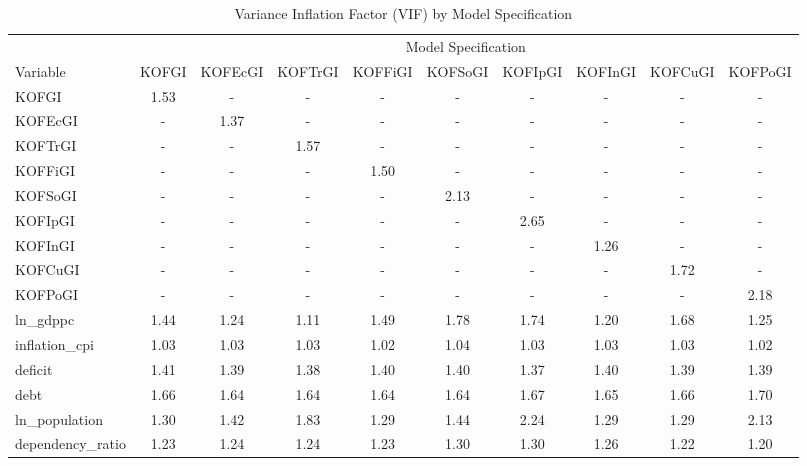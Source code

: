 \begin{table}
\caption{Variance Inflation Factor (VIF) by Model Specification}
\label{tab:vif}
\begin{tabular}{lccccccccc}
\toprule
& \multicolumn{9}{c}{Model Specification} \\
\cmidrule(lr){2-10}
Variable & KOFGI & KOFEcGI & KOFTrGI & KOFFiGI & KOFSoGI & KOFIpGI & KOFInGI & KOFCuGI & KOFPoGI \\
\midrule
KOFGI & 1.53 & - & - & - & - & - & - & - & - \\
KOFEcGI & - & 1.37 & - & - & - & - & - & - & - \\
KOFTrGI & - & - & 1.57 & - & - & - & - & - & - \\
KOFFiGI & - & - & - & 1.50 & - & - & - & - & - \\
KOFSoGI & - & - & - & - & 2.13 & - & - & - & - \\
KOFIpGI & - & - & - & - & - & 2.65 & - & - & - \\
KOFInGI & - & - & - & - & - & - & 1.26 & - & - \\
KOFCuGI & - & - & - & - & - & - & - & 1.72 & - \\
KOFPoGI & - & - & - & - & - & - & - & - & 2.18 \\
ln_gdppc & 1.44 & 1.24 & 1.11 & 1.49 & 1.78 & 1.74 & 1.20 & 1.68 & 1.25 \\
inflation_cpi & 1.03 & 1.03 & 1.03 & 1.02 & 1.04 & 1.03 & 1.03 & 1.03 & 1.02 \\
deficit & 1.41 & 1.39 & 1.38 & 1.40 & 1.40 & 1.37 & 1.40 & 1.39 & 1.39 \\
debt & 1.66 & 1.64 & 1.64 & 1.64 & 1.64 & 1.67 & 1.65 & 1.66 & 1.70 \\
ln_population & 1.30 & 1.42 & 1.83 & 1.29 & 1.44 & 2.24 & 1.29 & 1.29 & 2.13 \\
dependency_ratio & 1.23 & 1.24 & 1.24 & 1.23 & 1.30 & 1.30 & 1.26 & 1.22 & 1.20 \\
\bottomrule
\end{tabular}
\end{table}
